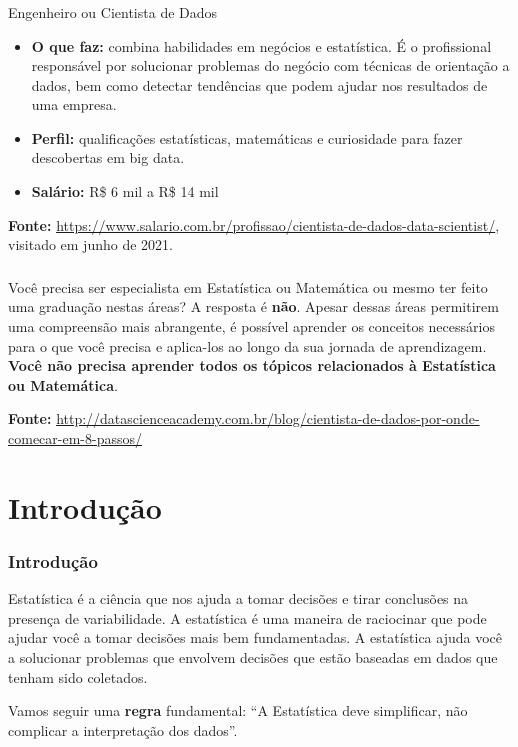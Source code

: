 \documentclass[12pt]{beamer}
\begin{document}
\begin{frame}{}
\frametitle{}
\begin{block}{Engenheiro ou Cientista de Dados}
\begin{itemize}
\justifying
\item {\bf O que faz:} combina habilidades em negócios e estatística. É o profissional responsável por solucionar problemas do negócio com técnicas de orientação a dados, bem como detectar tendências que podem ajudar nos resultados de uma empresa.
\item {\bf Perfil:} qualificações estatísticas, matemáticas e curiosidade para fazer descobertas em big data.
\item {\bf Salário:} R\$ 6 mil a R\$ 14 mil\\
\end{itemize}
{\bf Fonte:} \url{https://www.salario.com.br/profissao/cientista-de-dados-data-scientist/}, visitado em junho de 2021.
\end{block}
\end{frame}


\begin{frame}{}
\frametitle{}
\begin{block}{}
\justifying
Você precisa ser especialista em Estatística ou Matemática ou mesmo ter feito uma graduação nestas áreas? \pause A resposta é {\bf não}. \pause Apesar dessas áreas permitirem uma compreensão mais abrangente, é possível aprender os conceitos necessários para o que você precisa e aplica-los ao longo da sua jornada de aprendizagem. \textbf{Você não precisa aprender todos os tópicos relacionados à Estatística ou Matemática}.

{\bf Fonte:} \url{http://datascienceacademy.com.br/blog/cientista-de-dados-por-onde-comecar-em-8-passos/}
\end{block}
\end{frame}

\section{Introdução}
\begin{frame}{}
\frametitle{Introdução}
\begin{block}{}
\justifying
Estatística é a ciência que nos ajuda a tomar decisões e tirar conclusões na presença de variabilidade. A estatística é uma maneira de raciocinar que pode ajudar você a tomar decisões mais bem fundamentadas. A estatística ajuda você a solucionar problemas que envolvem decisões que estão baseadas em dados que tenham sido coletados.
\end{block}
\pause
\begin{block}{}
\justifying
Vamos seguir uma \textbf{regra} fundamental:
``A Estatística deve simplificar, não complicar a interpretação dos dados''.
\end{block}
\end{frame}
\end{document}
